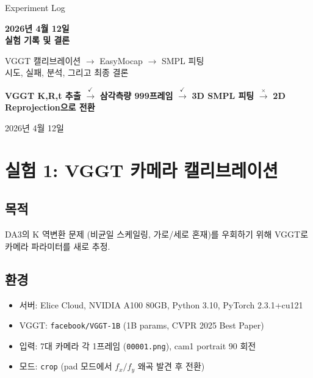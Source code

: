 \documentclass[11pt, a4paper]{report}
\begin{document}
\begin{titlepage}
\centering
\vspace*{1.5cm}
{\Large\color{gray} Experiment Log}
\vspace{0.5cm}

{\Huge\bfseries\color{defblue} 2026년 4월 12일\\[0.3cm]
실험 기록 및 결론}

\vspace{1cm}

{\LARGE\color{defblue!70!black} VGGT 캘리브레이션 $\rightarrow$ EasyMocap $\rightarrow$ SMPL 피팅\\
시도, 실패, 분석, 그리고 최종 결론}

\vspace{2cm}

\textbf{VGGT K,R,t 추출} $\xrightarrow{\checkmark}$
\textbf{삼각측량 999프레임} $\xrightarrow{\checkmark}$
\textbf{3D SMPL 피팅} $\xrightarrow{\times}$
\textbf{2D Reprojection으로 전환}

\vspace{2cm}
{\large 2026년 4월 12일}
\end{titlepage}

\tableofcontents
\newpage


\chapter{실험 1: VGGT 카메라 캘리브레이션}

\section{목적}
DA3의 K 역변환 문제 (비균일 스케일링, 가로/세로 혼재)를 우회하기 위해 VGGT로 카메라 파라미터를 새로 추정.

\section{환경}
\begin{itemize}[leftmargin=*]
  \item 서버: Elice Cloud, NVIDIA A100 80GB, Python 3.10, PyTorch 2.3.1+cu121
  \item VGGT: \texttt{facebook/VGGT-1B} (1B params, CVPR 2025 Best Paper)
  \item 입력: 7대 카메라 각 1프레임 (\texttt{00001.png}), cam1 portrait 90\textdegree{} 회전
  \item 모드: \texttt{crop} (pad 모드에서 $f_x/f_y$ 왜곡 발견 후 전환)
\end{itemize}
\end{document}
